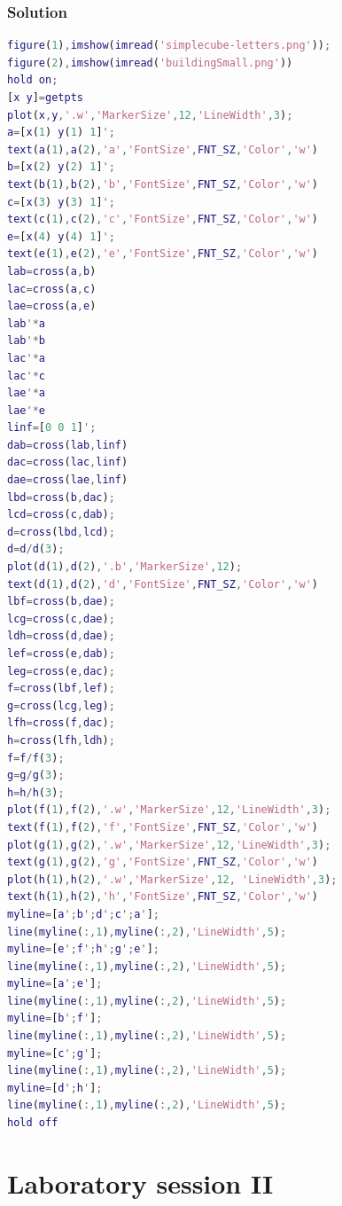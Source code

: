 \documentclass[12pt, a4paper]{report}
\newtheorem[style=M,bodystyle=\normalfont]{theorem}{Theorem}
\newtheorem[style=M,bodystyle=\normalfont]{corollary}{Corollary}
\newtheorem[style=M,bodystyle=\normalfont]{lemma}{Lemma}
\newtheorem[style=M,bodystyle=\normalfont]{definition}{Definition}
\begin{document}
    \subsection*{Solution}
        \begin{lstlisting}[language=Matlab]
figure(1),imshow(imread('simplecube-letters.png'));
figure(2),imshow(imread('buildingSmall.png'))
hold on;
[x y]=getpts
plot(x,y,'.w','MarkerSize',12,'LineWidth',3);
a=[x(1) y(1) 1]';
text(a(1),a(2),'a','FontSize',FNT_SZ,'Color','w')
b=[x(2) y(2) 1]';
text(b(1),b(2),'b','FontSize',FNT_SZ,'Color','w')
c=[x(3) y(3) 1]';
text(c(1),c(2),'c','FontSize',FNT_SZ,'Color','w')
e=[x(4) y(4) 1]';
text(e(1),e(2),'e','FontSize',FNT_SZ,'Color','w')
lab=cross(a,b)
lac=cross(a,c)
lae=cross(a,e)
lab'*a
lab'*b
lac'*a
lac'*c
lae'*a
lae'*e
linf=[0 0 1]';
dab=cross(lab,linf)
dac=cross(lac,linf)
dae=cross(lae,linf)
lbd=cross(b,dac);
lcd=cross(c,dab);
d=cross(lbd,lcd);
d=d/d(3);
plot(d(1),d(2),'.b','MarkerSize',12);
text(d(1),d(2),'d','FontSize',FNT_SZ,'Color','w')
lbf=cross(b,dae);
lcg=cross(c,dae);
ldh=cross(d,dae);
lef=cross(e,dab);
leg=cross(e,dac);
f=cross(lbf,lef);
g=cross(lcg,leg);
lfh=cross(f,dac);
h=cross(lfh,ldh);
f=f/f(3);
g=g/g(3);
h=h/h(3);
plot(f(1),f(2),'.w','MarkerSize',12,'LineWidth',3); 
text(f(1),f(2),'f','FontSize',FNT_SZ,'Color','w')
plot(g(1),g(2),'.w','MarkerSize',12,'LineWidth',3); 
text(g(1),g(2),'g','FontSize',FNT_SZ,'Color','w')
plot(h(1),h(2),'.w','MarkerSize',12, 'LineWidth',3);
text(h(1),h(2),'h','FontSize',FNT_SZ,'Color','w')
myline=[a';b';d';c';a'];
line(myline(:,1),myline(:,2),'LineWidth',5);
myline=[e';f';h';g';e'];
line(myline(:,1),myline(:,2),'LineWidth',5);
myline=[a';e'];
line(myline(:,1),myline(:,2),'LineWidth',5);
myline=[b';f'];
line(myline(:,1),myline(:,2),'LineWidth',5);
myline=[c';g'];
line(myline(:,1),myline(:,2),'LineWidth',5);
myline=[d';h'];
line(myline(:,1),myline(:,2),'LineWidth',5);
hold off
        \end{lstlisting}

\newpage

\chapter{Laboratory session II}
\end{document}
